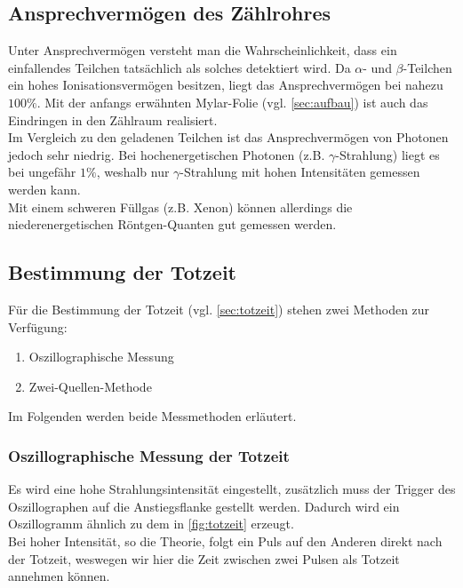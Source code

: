 \subsection{Ansprechvermögen des Zählrohres}
\label{sec:theo:ansprechvermoegen}
Unter Ansprechvermögen versteht man die Wahrscheinlichkeit, dass ein einfallendes Teilchen tatsächlich als solches 
detektiert wird. Da $\alpha$- und $\beta$-Teilchen ein hohes Ionisationsvermögen besitzen, liegt das Ansprechvermögen
bei nahezu $100\%$. Mit der anfangs erwähnten Mylar-Folie (vgl. \autoref{sec:aufbau}) ist auch das Eindringen in
den Zählraum realisiert.
\\
Im Vergleich zu den geladenen Teilchen ist das Ansprechvermögen von Photonen jedoch sehr niedrig. Bei hochenergetischen
Photonen (z.B. $\gamma$-Strahlung) liegt es bei ungefähr $1\%$, weshalb nur $\gamma$-Strahlung mit hohen
Intensitäten gemessen werden kann.
\\
Mit einem schweren Füllgas (z.B. Xenon) können allerdings die niederenergetischen Röntgen-Quanten gut gemessen werden.
\subsection{Bestimmung der Totzeit}
\label{sec:bestimmung-totzeit}
Für die Bestimmung der Totzeit (vgl. \autoref{sec:totzeit}) stehen zwei Methoden zur Verfügung:
\begin{enumerate}
	\item Oszillographische Messung
	\item Zwei-Quellen-Methode
\end{enumerate}
Im Folgenden werden beide Messmethoden erläutert.
\subsubsection{Oszillographische Messung der Totzeit}
\label{sec:theo:oszillographisch}
Es wird eine hohe Strahlungsintensität eingestellt, zusätzlich muss der Trigger des Oszillographen auf die 
Anstiegsflanke gestellt werden. Dadurch wird ein Oszillogramm ähnlich zu dem in \autoref{fig:totzeit} erzeugt.
\\
Bei hoher Intensität, so die Theorie, folgt ein Puls auf den Anderen direkt nach der Totzeit, weswegen wir hier die
Zeit zwischen zwei Pulsen als Totzeit annehmen können.
